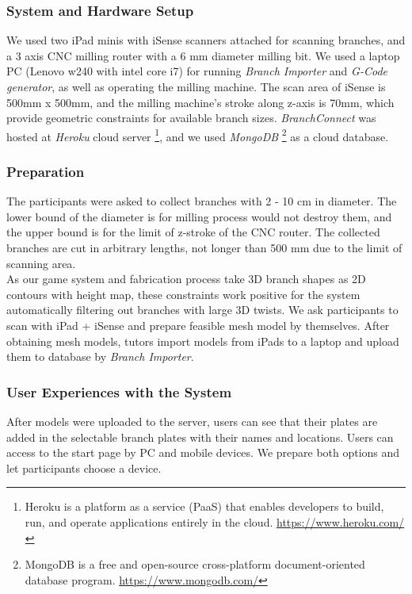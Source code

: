\subsubsection*{System and Hardware Setup}
We used two iPad minis with iSense scanners attached for scanning branches, and a 3 axis CNC milling router with a 6 mm diameter milling bit.
We used a laptop PC (Lenovo w240 with intel core i7) for running \textit{Branch Importer} and \textit{G-Code generator}, as well as operating the milling machine.
The scan area of iSense is 500mm x 500mm, and the milling machine's stroke along z-axis is 70mm, which provide geometric constraints for available branch sizes.
\textit{BranchConnect} was hosted at \textit{Heroku} cloud server \footnote{ Heroku is a platform as a service (PaaS) that enables developers to build, run, and operate applications entirely in the cloud. \url{https://www.heroku.com/}},
and we used \textit{MongoDB} \footnote{ MongoDB is a free and open-source cross-platform document-oriented database program. \url{https://www.mongodb.com/}} as a cloud database.

\subsubsection*{Preparation}
The participants were asked to collect branches with 2 - 10 cm in diameter.
The lower bound of the diameter is for milling process would not destroy them, and the upper bound is for the limit of z-stroke of the CNC router.
The collected branches are cut in arbitrary lengths, not longer than 500 mm due to the limit of scanning area. \\

As our game system and fabrication process take 3D branch shapes as 2D contours with height map, these constraints work positive for the system automatically filtering out branches with large 3D twists.
We ask participants to scan with iPad + iSense and prepare feasible mesh model by themselves.
After obtaining mesh models, tutors import models from iPads to a laptop and upload them to database by \textit{Branch Importer}.


\subsubsection*{User Experiences with the System}
After models were uploaded to the server, users can see that their plates are added in the selectable branch plates with their names and locations.
Users can access to the start page by PC and mobile devices.
We prepare both options and let participants choose a device.

